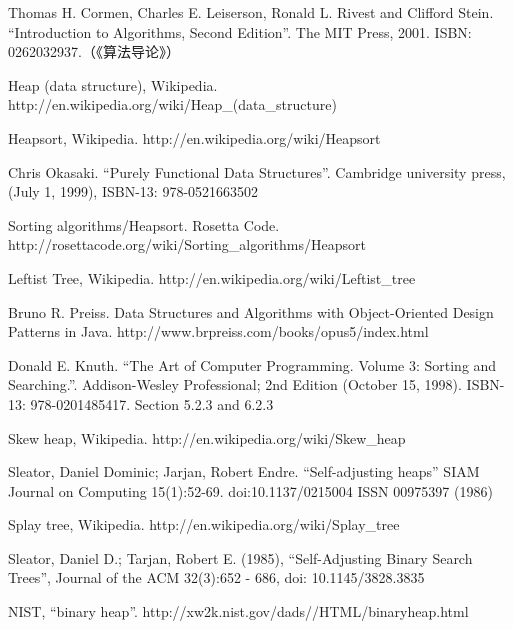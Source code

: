 \documentclass[UTF8]{article}
\begin{document}
\ifx\wholebook\relax \else
\begin{thebibliography}{99}

Thomas H. Cormen, Charles E. Leiserson, Ronald L. Rivest and Clifford Stein. ``Introduction to Algorithms, Second Edition''. The MIT Press, 2001. ISBN: 0262032937.（《算法导论》）

Heap (data structure), Wikipedia. http://en.wikipedia.org/wiki/Heap\_(data\_structure)

Heapsort, Wikipedia. http://en.wikipedia.org/wiki/Heapsort

Chris Okasaki. ``Purely Functional Data Structures''. Cambridge university press, (July 1, 1999), ISBN-13: 978-0521663502

Sorting algorithms/Heapsort. Rosetta Code. http://rosettacode.org/wiki/Sorting\_algorithms/Heapsort

Leftist Tree, Wikipedia. http://en.wikipedia.org/wiki/Leftist\_tree

Bruno R. Preiss. Data Structures and Algorithms with Object-Oriented Design Patterns in Java. http://www.brpreiss.com/books/opus5/index.html

Donald E. Knuth. ``The Art of Computer Programming. Volume 3: Sorting and Searching.''. Addison-Wesley Professional;
2nd Edition (October 15, 1998). ISBN-13: 978-0201485417. Section 5.2.3 and 6.2.3

Skew heap, Wikipedia. http://en.wikipedia.org/wiki/Skew\_heap

Sleator, Daniel Dominic; Jarjan, Robert Endre. ``Self-adjusting heaps'' SIAM Journal on Computing 15(1):52-69. doi:10.1137/0215004 ISSN 00975397 (1986)

Splay tree, Wikipedia. http://en.wikipedia.org/wiki/Splay\_tree

Sleator, Daniel D.; Tarjan, Robert E. (1985), ``Self-Adjusting Binary Search Trees'', Journal of the ACM 32(3):652 - 686, doi: 10.1145/3828.3835

NIST, ``binary heap''. http://xw2k.nist.gov/dads//HTML/binaryheap.html

\end{thebibliography}
\end{document}
